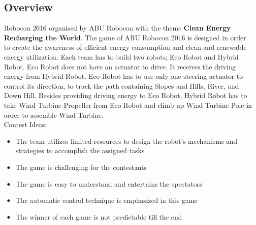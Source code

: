 \documentclass[12pt,a4paper]{article}
\begin{document}
    \subsection{Overview}
      Robocon 2016 organised by ABU Robocon with the theme \textbf{Clean Energy Recharging the World}.
      The game of ABU Robocon 2016 is designed in order to create the 
      awareness of efficient energy consumption and clean and renewable 
      energy utilization. Each team has to build two robots; Eco Robot 
      and Hybrid Robot. Eco Robot does not have an actuator to drive. 
      It receives the driving energy from Hybrid Robot. Eco Robot has 
      to use only one steering actuator to control its direction, to 
      track the path containing Slopes and Hills, River, and Down Hill. 
      Besides providing driving energy to Eco Robot, Hybrid Robot has to 
      take Wind Turbine Propeller from Eco Robot and climb up Wind Turbine 
      Pole in order to assemble Wind Turbine.\vspace{2mm}\\
      Contest Ideas:
      \begin{itemize}
        \item The team utilizes limited resources to design the robot's mechanisms 
              and strategies to accomplish the assigned tasks
        \item The game is challenging for the contestants
        \item The game is easy to understand and entertains the spectators
        \item The automatic control technique is emphasized in this game
        \item The winner of each game is not predictable till the end
      \end{itemize}
    \clearpage
\end{document}
